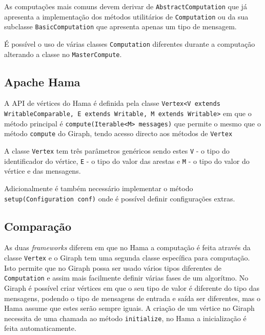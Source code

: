 As computações mais comuns devem derivar de \texttt{AbstractComputation} que já apresenta a implementação dos métodos utilitários de \texttt{Computation} ou da sua subclasse \texttt{BasicComputation} que apresenta apenas um tipo de mensagem.

É possível o uso de várias classes \texttt{Computation} diferentes durante a computação alterando a classe no \texttt{MasterCompute}.

\subsection*{Apache Hama}
A API de vértices do Hama é definida pela classe \texttt{Vertex<V extends WritableComparable, E extends Writable, M extends Writable>} em que o método principal é \texttt{compute(Iterable<M> messages)} que permite o mesmo que o método \texttt{compute} do Giraph, tendo acesso directo aos métodos de \texttt{Vertex}

A classe \texttt{Vertex} tem três parâmetros genéricos sendo estes \texttt{V} - o tipo do identificador do vértice, \texttt{E} - o tipo do valor das arestas e \texttt{M} - o tipo do valor do vértice e das mensagens.


Adicionalmente é também necessário implementar o método \texttt{setup(Configuration conf)} onde é possível definir configurações extras.
\subsection*{Comparação}


As duas \textit{frameworks} diferem em que no Hama a computação é feita através da classe \texttt{Vertex} e o Giraph tem uma segunda classe específica para computação. Isto permite que no Giraph possa ser usado vários tipos diferentes de \texttt{Computation} e assim mais facilmente definir várias fases de um algorítmo.
No Giraph é possível criar vértices em que o seu tipo de valor é diferente do tipo das mensagens, podendo o tipo de mensagens de entrada e saída ser diferentes, mas o Hama assume que estes serão sempre iguais. A criação de um vértice no Giraph necessita de uma chamada ao método \texttt{initialize}, no Hama a inicialização é feita automaticamente.